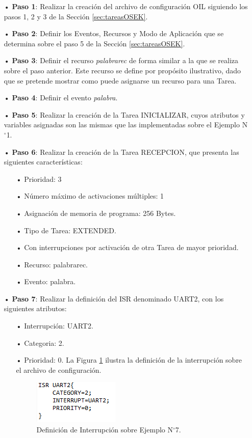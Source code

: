 \documentclass[12pt,letterpaper]{article}
\begin{document}
\begin{enumerate}

\item[•]\textbf{Paso 1}: Realizar la creación del archivo de configuración OIL siguiendo los pasos 1, 2 y 3 de la Sección \ref{sec:tareasOSEK}.
\item[•]\textbf{Paso 2}: Definir los Eventos, Recursos y Modo de Aplicación que se determina sobre el paso 5 de la Sección \ref{sec:tareasOSEK}.
\item[•]\textbf{Paso 3}: Definir el recurso \textit{palabrarec} de forma similar a la que se realiza sobre el paso anterior. Este recurso se define por propósito ilustrativo, dado que se pretende mostrar como puede asignarse un recurso para una Tarea.
\item[•]\textbf{Paso 4}: Definir el evento \textit{palabra}.
\item[•]\textbf{Paso 5}: Realizar la creación de la Tarea INICIALIZAR, cuyos atributos y variables asignadas son las mismas que las implementadas sobre el Ejemplo N$^{\circ}$1.

\item[•]\textbf{Paso 6}: Realizar la creación de la Tarea RECEPCION, que presenta las siguientes características:
\begin{enumerate}
\item[•]Prioridad: 3
\item[•]Número máximo de activaciones múltiples: 1
\item[•]Asignación de memoria de programa: 256 Bytes.
\item[•]Tipo de Tarea: EXTENDED.
\item[•]Con interrupciones por activación de otra Tarea de mayor prioridad.
\item[•]Recurso: palabrarec.
\item[•]Evento: palabra.
\end{enumerate}

\item[•]\textbf{Paso 7}: Realizar la definición del ISR denominado UART2, con los siguientes atributos:
\begin{enumerate}
\item[•]Interrupción: UART2.
\item[•]Categoria: 2.
\item[•]Prioridad: 0. La Figura \ref{Fig44} ilustra la definición de la interrupción sobre el archivo de configuración.
\begin{figure}[H]
\centering
\includegraphics[width=5 cm]{figuras/f35.png}
\caption{Definición de Interrupción sobre Ejemplo N$^{\circ}$7.}
\label{Fig44}
\end{figure}
\end{enumerate}


\end{enumerate}
\end{document}
